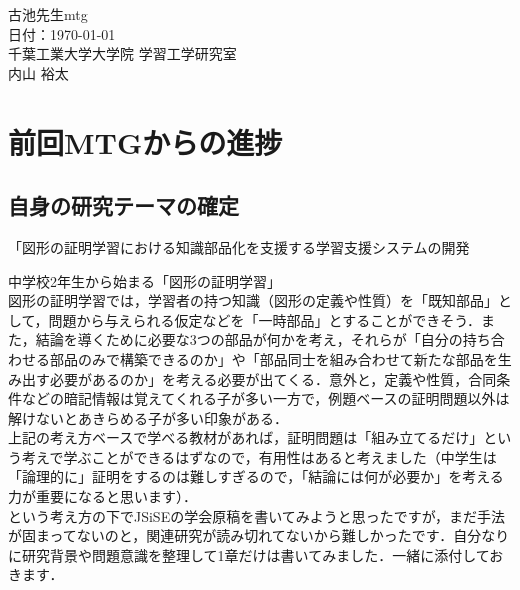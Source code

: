 \documentclass[a4paper,12pt]{ltjsarticle}
\begin{document}
\begin{center}
  {\huge 古池先生mtg}\\[1em]
  {\large 日付：\today}\\
  {\large 千葉工業大学大学院 学習工学研究室}\\
  {\large 内山 裕太}
\end{center}

\vspace{2em}


\section{前回MTGからの進捗}
\subsection{自身の研究テーマの確定}
「図形の証明学習における知識部品化を支援する学習支援システムの開発

中学校2年生から始まる「図形の証明学習」\\

図形の証明学習では，学習者の持つ知識（図形の定義や性質）を「既知部品」として，問題から与えられる仮定などを「一時部品」とすることができそう．また，結論を導くために必要な3つの部品が何かを考え，それらが「自分の持ち合わせる部品のみで構築できるのか」や「部品同士を組み合わせて新たな部品を生み出す必要があるのか」を考える必要が出てくる．意外と，定義や性質，合同条件などの暗記情報は覚えてくれる子が多い一方で，例題ベースの証明問題以外は解けないとあきらめる子が多い印象がある．\\

上記の考え方ベースで学べる教材があれば，証明問題は「組み立てるだけ」という考えで学ぶことができるはずなので，有用性はあると考えました（中学生は「論理的に」証明をするのは難しすぎるので，「結論には何が必要か」を考える力が重要になると思います）．\\

という考え方の下でJSiSEの学会原稿を書いてみようと思ったですが，まだ手法が固まってないのと，関連研究が読み切れてないから難しかったです．自分なりに研究背景や問題意識を整理して1章だけは書いてみました．一緒に添付しておきます．\\
\end{document}
